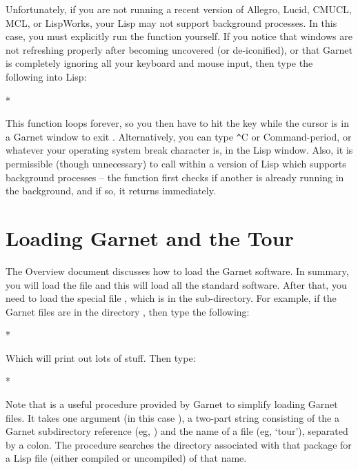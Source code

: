 Unfortunately, if you are not running a recent version of Allegro,
Lucid, CMUCL, MCL, or LispWorks, your Lisp may not support background
processes. In this case, you must explicitly run
the function yourself.  If you notice that windows are not refreshing
properly after becoming uncovered (or de-iconified), or that Garnet is
completely ignoring all your keyboard and mouse input, then type the
following into Lisp:
\begin{programexample}
* 
\end{programexample}
This function loops forever, so you then have to hit the
 key while the cursor is in a Garnet window to exit
.  Alternatively, you can type {\texttt \^}C or Command-period,
or whatever your operating system break character is,
in the Lisp window.  Also, it is permissible (though unnecessary) to call
 within a version of Lisp which supports background
processes -- the function first checks if another 
is already running in the background, and if so, it returns immediately.


\section{Loading Garnet and the Tour}

The Overview document discusses how to load the Garnet software.  In
summary, you will load the file  and this will load all
the standard software.  After that, you need to load the special file
, which is in the  sub-directory.
For example, if the Garnet files are in the directory
, then type the following:

\begin{programexample}
* 
\end{programexample}
Which will print out lots of stuff.  Then type:
\begin{programexample}
* 
\end{programexample}
Note that  is a useful procedure
provided by Garnet to simplify loading Garnet files.  It takes one
argument (in this case ), a two-part string consisting of
the a Garnet subdirectory reference (eg, ) and
the name of a file (eg, `tour'), separated by a colon.  The procedure
searches the directory associated with that package for a Lisp file (either
compiled or uncompiled) of that name.



